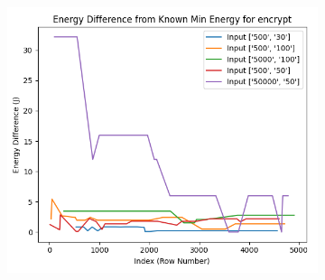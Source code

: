\documentclass[times, 10pt,twocolumn]{article}
\begin{document}
\begin{figure}[ht]
\begin{subfigure}[b]{0.22\textwidth}
     \caption{}
     \label{fig:encrypt_energy_diff}
   \end{subfigure}
   \hfill
   \begin{subfigure}[b]{0.22\textwidth}
      \includegraphics[width=\textwidth]{imgs/final_experiment_plots/model_analysis/measurement_data_analysis/encrypt_compare_min.png}
     \caption{}
     \label{fig:encrypt_compare_min}
   \end{subfigure}
   

\end{figure}
\end{document}

